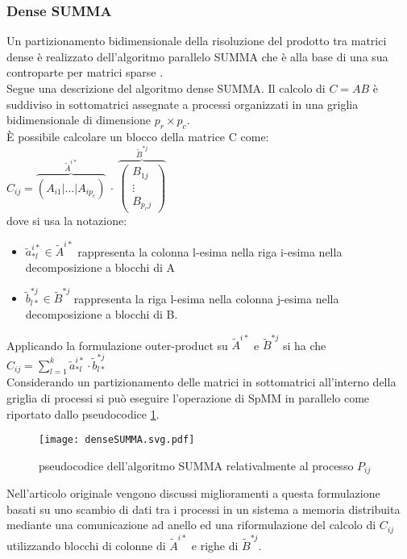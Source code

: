 \subsubsection{Dense SUMMA} %
Un partizionamento bidimensionale della risoluzione del prodotto tra matrici
dense è realizzato dell'algoritmo parallelo SUMMA \cite{denseSumma} che è alla
base di una sua controparte per matrici sparse \cite{sparseSUMMA}.\\
Segue una descrizione del algoritmo dense SUMMA.
\voidLine
Il calcolo di $C=AB$ è suddiviso in sottomatrici assegnate a processi organizzati 
in una griglia bidimensionale di dimensione  $p_r \times p_c$.\\
È possibile calcolare un blocco della matrice C come:
$C_{ij} =  \overbrace{\left(  A_{i1} | \dots |  A_{ip_c} \right)}^{\tilde{A}^{i*} }
~\cdot~ \overbrace{\left( 
        \begin{array}{c} B_{1j} \\ \vdots \\  B_{p_r j}
        \end{array} \right)} ^{\tilde{B}^{*j}} $\\
dove si usa la notazione:
\begin{itemize}
  \item $\tilde{a}_{*l}^{i*} \in \tilde{A}^{i*}$ rappresenta 
    la colonna l-esima nella riga i-esima nella decomposizione a blocchi di A
  \item $\tilde{b}_{l*}^{*j} \in  \tilde{B}^{*j}$ rappresenta 
    la riga l-esima nella colonna j-esima nella decomposizione a blocchi di B.
\end{itemize}  
Applicando la formulazione outer-product su $\tilde{A}^{i*}$ e $\tilde{B}^{*j}$
si ha che $C_{ij}=\sum\limits_{l=1}^{k}\tilde{a}_{*l}^{i*} \cdot \tilde{b}_{l*}^{*j}$\\
Considerando un partizionamento delle matrici in sottomatrici all'interno della
griglia di processi %
si può eseguire l'operazione di SpMM in parallelo come riportato dallo pseudocodice \ref{figCode:denseSUMMA}.\\
\begin{figure}[H]
  \centering \texttt{[image: denseSUMMA.svg.pdf]}
  \caption[pseudocodice dense SUMMA]{pseudocodice dell'algoritmo SUMMA relativalmente al processo $P_{ij}$} \decoRule \label{figCode:denseSUMMA}
\end{figure}
Nell'articolo originale vengono discussi miglioramenti a questa formulazione
basati su uno scambio di dati tra i processi in un sistema a memoria distribuita
mediante una comunicazione ad anello 
ed una riformulazione del calcolo di $C_{ij}$ utilizzando blocchi di
colonne di $\tilde{A}^{i*}$ e righe di $\tilde{B}^{*j}$.\\

